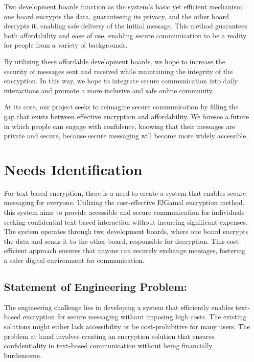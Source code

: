 \documentclass[12pt]{article}
\begin{document}
Two development boards function as the system's basic yet efficient mechanism: one board encrypts the data, guaranteeing its privacy, and the other board decrypts it, enabling safe delivery of the initial message. This method guarantees both affordability and ease of use, enabling secure communication to be a reality for people from a variety of backgrounds.

By utilizing these affordable development boards, we hope to increase the security of messages sent and received while maintaining the integrity of the encryption. In this way, we hope to integrate secure communication into daily interactions and promote a more inclusive and safe online community.

At its core, our project seeks to reimagine secure communication by filling the gap that exists between effective encryption and affordability. We foresee a future in which people can engage with confidence, knowing that their messages are private and secure, because secure messaging will become more widely accessible.


\vskip 20cm
	\section{Needs Identification}

For text-based encryption, there is a need to create a system that enables secure messaging for everyone. Utilizing the cost-effective ElGamal encryption method, this system aims to provide accessible and secure communication for individuals seeking confidential text-based interaction without incurring significant expenses. The system operates through two development boards, where one board encrypts the data and sends it to the other board, responsible for decryption. This cost-efficient approach ensures that anyone can securely exchange messages, fostering a safer digital environment for communication.

	
	\subsection{Statement of Engineering Problem:}
	The engineering challenge lies in developing a system that efficiently enables text-based encryption for secure messaging without imposing high costs. The existing solutions might either lack accessibility or be cost-prohibitive for many users. The problem at hand involves creating an encryption solution that ensures confidentiality in text-based communication without being financially burdensome.
	
\end{document}
